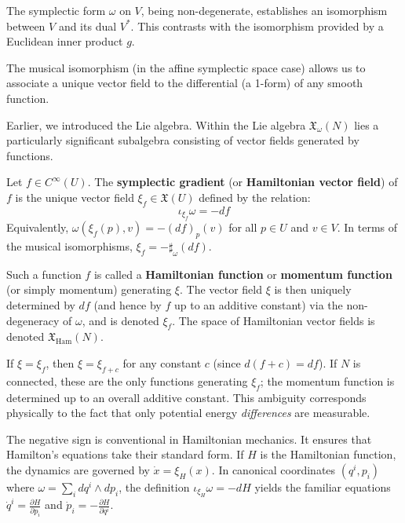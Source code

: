 The symplectic form $\omega$ on $V$, being non-degenerate, establishes an isomorphism between $V$ and its dual $V^*$. This contrasts with the isomorphism provided by a Euclidean inner product $g$.

The musical isomorphism (in the affine symplectic space case) allows us to associate a unique vector field to the differential (a 1-form) of any smooth function.

Earlier, we introduced the Lie algebra. Within the Lie algebra $\mathfrak{X}_{\omega}(N)$ lies a particularly significant subalgebra consisting of vector fields generated by functions.

\begin{definition}
Let $f \in C^\infty(U)$. The \textbf{symplectic gradient} (or \textbf{Hamiltonian vector field}) of $f$ is the unique vector field $\xi_f \in \mathfrak{X}(U)$ defined by the relation:
\[
\iota_{\xi_f} \omega = -d f
\]
Equivalently, $\omega(\xi_f(p), v) = -(d f)_p(v)$ for all $p \in U$ and $v \in V$. In terms of the musical isomorphisms, $\xi_f = -\sharp_\omega (d f)$.

Such a function $f$ is called a \textbf{Hamiltonian function} or \textbf{momentum function} (or simply momentum) generating $\xi$. The vector field $\xi$ is then uniquely determined by $df$ (and hence by $f$ up to an additive constant) via the non-degeneracy of $\omega$, and is denoted $\xi_f$. The space of Hamiltonian vector fields is denoted $\mathfrak{X}_{\mathrm{Ham}}(N)$.
\end{definition}

\begin{remark}
If $\xi = \xi_f$, then $\xi = \xi_{f+c}$ for any constant $c$ (since $d(f+c) = df$). If $N$ is connected, these are the only functions generating $\xi_f$; the momentum function is determined up to an overall additive constant. This ambiguity corresponds physically to the fact that only potential energy \textit{differences} are measurable.
\end{remark}

\begin{remark}
The negative sign is conventional in Hamiltonian mechanics. It ensures that Hamilton's equations take their standard form. If $H$ is the Hamiltonian function, the dynamics are governed by $\dot{x} = \xi_H(x)$. In canonical coordinates $(q^i, p_i)$ where $\omega = \sum_i d q^i \wedge d p_i$, the definition $\iota_{\xi_H} \omega = -d H$ yields the familiar equations $\dot{q}^i = \frac{\partial H}{\partial p_i}$ and $\dot{p}_i = -\frac{\partial H}{\partial q^i}$.
\end{remark}


